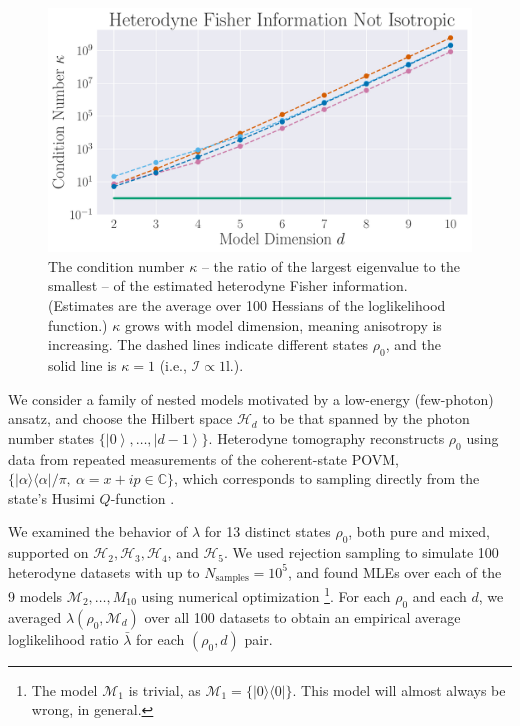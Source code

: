 \documentclass[aps,pra, twocolumn]{revtex4-1}
\newcommand{\M}{\mathcal{M}}
\newcommand{\Id}{\mathbb{I}}
\newcommand{\ket}[1]{\ensuremath{\left|#1\right\rangle}}
\def\Id{1\!\mathrm{l}}
\begin{document}
\begin{figure}[h]
  \includegraphics[width=\columnwidth]{Images/Figure_7.pdf}
 \caption{The condition number $\kappa$ -- the ratio of the largest eigenvalue to the smallest -- of the estimated heterodyne Fisher information. (Estimates are the average over 100 Hessians of the loglikelihood function.) $\kappa$ grows with model dimension, meaning anisotropy is increasing.  The dashed lines indicate different states $\rho_{0}$, and the solid line is $\kappa = 1$ (i.e., $\mathcal{I} \propto \Id$.).}
\label{fig:fish_condition}
\end{figure}

We consider a family of nested models motivated by a low-energy (few-photon) ansatz, and choose   
the Hilbert space $\mathcal{H}_d$ to be that spanned by the photon number states $\{\ket{0},\ldots ,\ket{d-1}\}$.
Heterodyne tomography reconstructs $\rho_{0}$ using data from repeated measurements of the 
coherent-state POVM, $\{|\alpha\rangle\langle \alpha| /\pi, ~\alpha=x+ip\in \mathbb{C}\}$, which corresponds to sampling directly from the 
state's Husimi $Q$-function \cite{Husimi1940}.

We examined the behavior of $\lambda$ for 13 distinct states $\rho_{0}$, both pure and mixed, supported on $\mathcal{H}_{2}, \mathcal{H}_{3}, \mathcal{H}
_{4}$, and $\mathcal{H}_{5}$.  We used rejection sampling to simulate 100 heterodyne datasets with up to $N_{\mathrm{samples}}=10^5$, and found MLEs over each of the 9 models $\M_2, \ldots, M_{10}$ using numerical optimization \footnote{The model $\M_{1}$ is trivial, as $\M_{1} = \{|0\rangle \langle 0|\}$. This model will almost always be wrong, in general.}.  For each $\rho_{0}$ and each $d$, we averaged $\lambda(\rho_{0}, \M_{d})$ over all 100 datasets to obtain an empirical average loglikelihood ratio $\bar{\lambda}$ for each $(\rho_0,d)$ pair.
\end{document}
